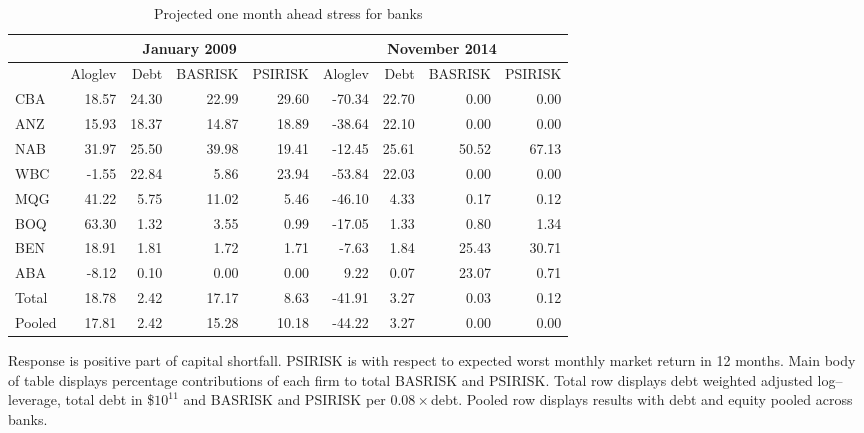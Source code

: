 \documentclass[12pt]{article}
\begin{document}
 
 \begin{table}[ht]
\caption{Projected one month ahead  stress for banks}\label{twodates}
\centering
\begin{threeparttable}
\small
\vspace{4mm}
\begin{tabular}{l|rrrr|rrrr}
\hline
&\multicolumn{4}{c|}{January 2009}&\multicolumn{4}{c}{November 2014}\\
  \hline
   & Aloglev& Debt & BASRISK & PSIRISK  & Aloglev & Debt  & BASRISK & PSIRISK\\  
  \hline
CBA & 18.57 & 24.30 & 22.99 & 29.60 & -70.34 & 22.70 & 0.00 & 0.00 \\ 
  ANZ & 15.93 & 18.37 & 14.87 & 18.89 & -38.64 & 22.10 & 0.00 & 0.00 \\ 
  NAB & 31.97 & 25.50 & 39.98 & 19.41 & -12.45 & 25.61 & 50.52 & 67.13 \\ 
  WBC & -1.55 & 22.84 & 5.86 & 23.94 & -53.84 & 22.03 & 0.00 & 0.00 \\ 
  MQG & 41.22 & 5.75 & 11.02 & 5.46 & -46.10 & 4.33 & 0.17 & 0.12 \\ 
  BOQ & 63.30 & 1.32 & 3.55 & 0.99 & -17.05 & 1.33 & 0.80 & 1.34 \\ 
  BEN & 18.91 & 1.81 & 1.72 & 1.71 & -7.63 & 1.84 & 25.43 & 30.71 \\ 
  ABA & -8.12 & 0.10 & 0.00 & 0.00 & 9.22 & 0.07 & 23.07 & 0.71 \\ 
  \hline
  Total & 18.78 & 2.42 & 17.17 & 8.63 & -41.91 & 3.27 & 0.03 & 0.12 \\ 
  Pooled & 17.81 & 2.42 & 15.28 & 10.18 & -44.22 & 3.27 & 0.00 & 0.00 \\ \hline
\end{tabular}
\begin{tablenotes}
\item[]Response is positive part of capital shortfall. PSIRISK is with respect to expected worst monthly market return  in 12 months.  Main body of table displays percentage contributions of each firm to total BASRISK and PSIRISK.   Total row displays debt weighted adjusted log--leverage, total debt in \$$10^{11}$ and BASRISK and PSIRISK per $0.08\times$debt.  Pooled row displays results with debt and equity pooled across banks. 
\end{tablenotes}
\end{threeparttable}
\end{table}
\normalsize
\end{document}
